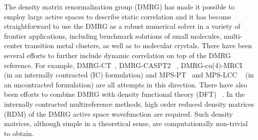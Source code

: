 The density matrix renormalization group (DMRG) \cite{white_density_1992, white_density-matrix_1993, ostlund_thermodynamic_1995, rommer_class_1997, white_ab_1999, Mitrushenkov2001, chan_highly_2002, legeza_controlling_2003, Legeza2003, legeza2003optimizing, legeza2004quantum, Chan2004, moritz2005convergence, moritz2005relativistic, rissler2006measuring, Zgid2009, legeza2008applications, Reiher2010review, Chan2011, schollwock_density-matrix_2005, schollwock_density-matrix_2011} has made it possible to employ large active spaces 
to describe static correlation\cite{white_ab_1999, chan_highly_2002, legeza_controlling_2003, moritz_decomposition_2007, verstraete_matrix_2008, marti_density_2008, zgid_spin_2008, marti_density_2010, kurashige_high-performance_2009, luo_optimizing_2010, chan_density_2011, marti_new_2011, sharma_spin-adapted_2012, wouters_longitudinal_2012, wouters_thouless_2013, kurashige_entangled_2013, wouters_communication:_2014} and it has become straightforward to
use the DMRG as a robust numerical solver in a variety of frontier applications, including benchmark solutions of small molecules\cite{chan_highly_2002, legeza_controlling_2003, luo_optimizing_2010, olivares-amaya_ab-initio_2015}, multi-center transition metal clusters\cite{kurashige_high-performance_2009, marti_new_2011, kurashige_entangled_2013, sharma_low-energy_2014}, as well as to molecular crystals\cite{yang_ab_2014}. There have been several
efforts to further include dynamic correlation on top of the DMRG reference.
For example, DMRG-CT~\cite{neuscamman_review_2010, Yanai2010}, DMRG-CASPT2 ~\cite{kurashige_second-order_2011}, DMRG-cu(4)-MRCI ~\cite{saitow_fully_2015} (in an internally contracted (IC) formulation) and MPS-PT~\cite{sharma_communication:_2014} and MPS-LCC ~\cite{sharma_multireference_2015} (in an uncontracted
formulation) 
are all attempts in this direction. There have also been efforts to combine DMRG with density functional theory (DFT) ~\cite{reiher_density_2015}.
In the internally contracted multireference methods, high order reduced density matrices (RDM) of the DMRG active space wavefunction are required.
Such density matrices, although simple in a theoretical sense, are computationally non-trivial to obtain.

